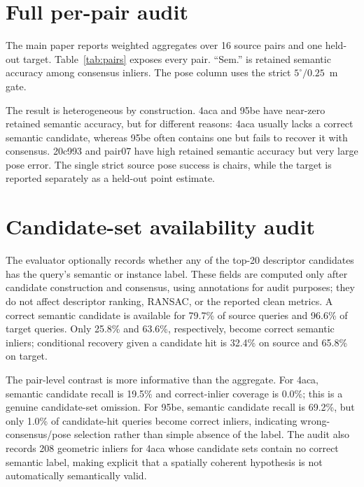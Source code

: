 \documentclass[10pt,twocolumn]{article}
\begin{document}
\section{Full per-pair audit}

The main paper reports weighted aggregates over 16 source pairs and one
held-out target. Table~\ref{tab:pairs} exposes every pair. ``Sem.'' is retained
semantic accuracy among consensus inliers. The pose column uses the strict
$5^\circ/0.25$~m gate.

\begin{table}[t]
\centering
\small
\resizebox{\textwidth}{!}{}
\caption{Complete ViT-G/14 per-pair audit with $K=20$, $\tau=0.10$~m, and
1,500 RANSAC iterations. $Q$ is the number of valid query patches and Inl. is
the number retained by spatial consensus.}
\label{tab:pairs}
\end{table}

The result is heterogeneous by construction. 4aca and 95be have near-zero
retained semantic accuracy, but for different reasons: 4aca usually lacks a correct
semantic candidate, whereas 95be often contains one but fails to recover it
with consensus. 20c993 and pair07 have high retained semantic accuracy but very large
pose error. The single strict source pose success is chairs, while the target
is reported separately as a held-out point estimate.

\section{Candidate-set availability audit}

The evaluator optionally records whether any of the top-20 descriptor
candidates has the query's semantic or instance label. These fields are
computed only after candidate construction and consensus, using annotations
for audit purposes; they do not affect descriptor ranking, RANSAC, or the
reported clean metrics. A correct semantic candidate is available for 79.7\%
of source queries and 96.6\% of target queries. Only 25.8\% and 63.6\%,
respectively, become correct semantic inliers; conditional recovery given a
candidate hit is 32.4\% on source and 65.8\% on target.

The pair-level contrast is more informative than the aggregate. For 4aca,
semantic candidate recall is 19.5\% and correct-inlier coverage is 0.0\%;
this is a genuine candidate-set omission. For 95be, semantic candidate recall
is 69.2\%, but only 1.0\% of candidate-hit queries become correct inliers,
indicating wrong-consensus/pose selection rather than simple absence of the
label. The audit also records 208 geometric inliers for 4aca whose candidate
sets contain no correct semantic label, making explicit that a spatially
coherent hypothesis is not automatically semantically valid.
\end{document}
